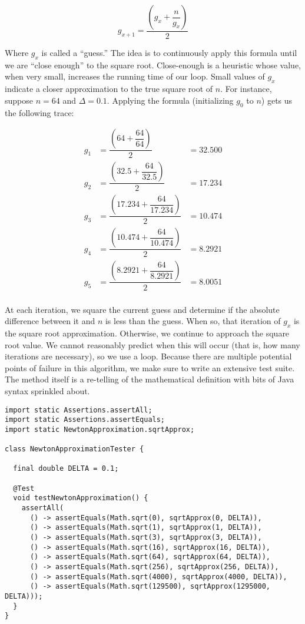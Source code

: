 
\[
    g_{x+1} = \dfrac{\left(g_x + \dfrac{n}{g_x}\right)}{2}
\]

Where $g_x$ is called a ``guess.'' The idea is to continuously apply this formula until we are ``close enough'' to the square root. Close-enough is a heuristic whose value, when very small, increases the running time of our loop. Small values of $g_x$ indicate a closer approximation to the true square root of $n$. For instance, suppose $n=64$ and $\Delta=0.1$. Applying the formula (initializing $g_0$ to $n$) gets us the following trace:

\begin{align*}
g_1 &= \dfrac{\left(64 + \dfrac{64}{64}\right)}{2} &= 32.500\\
g_2 &= \dfrac{\left(32.5 + \dfrac{64}{32.5}\right)}{2} &= 17.234\\
g_3 &= \dfrac{\left(17.234 + \dfrac{64}{17.234}\right)}{2} &= 10.474\\
g_4 &= \dfrac{\left(10.474 + \dfrac{64}{10.474}\right)}{2} &= 8.2921\\
g_5 &= \dfrac{\left(8.2921 + \dfrac{64}{8.2921}\right)}{2} &= 8.0051\\
\end{align*}

At each iteration, we square the current guess and determine if the absolute difference between it and $n$ is less than the guess. When so, that iteration of $g_x$ is the square root approximation. Otherwise, we continue to approach the square root value. We cannot reasonably predict when this will occur (that is, how many iterations are necessary), so we use a  loop. Because there are multiple potential points of failure in this algorithm, we make sure to write an extensive test suite. The method itself is a re-telling of the mathematical definition with bits of Java syntax sprinkled about. 

\begin{lstlisting}[language=MyJava]
import static Assertions.assertAll;
import static Assertions.assertEquals;
import static NewtonApproximation.sqrtApprox;

class NewtonApproximationTester {

  final double DELTA = 0.1;

  @Test
  void testNewtonApproximation() {
    assertAll(
      () -> assertEquals(Math.sqrt(0), sqrtApprox(0, DELTA)),
      () -> assertEquals(Math.sqrt(1), sqrtApprox(1, DELTA)),
      () -> assertEquals(Math.sqrt(3), sqrtApprox(3, DELTA)),
      () -> assertEquals(Math.sqrt(16), sqrtApprox(16, DELTA)),
      () -> assertEquals(Math.sqrt(64), sqrtApprox(64, DELTA)),
      () -> assertEquals(Math.sqrt(256), sqrtApprox(256, DELTA)),
      () -> assertEquals(Math.sqrt(4000), sqrtApprox(4000, DELTA)),
      () -> assertEquals(Math.sqrt(129500), sqrtApprox(1295000, DELTA)));
  }
}
\end{lstlisting}

